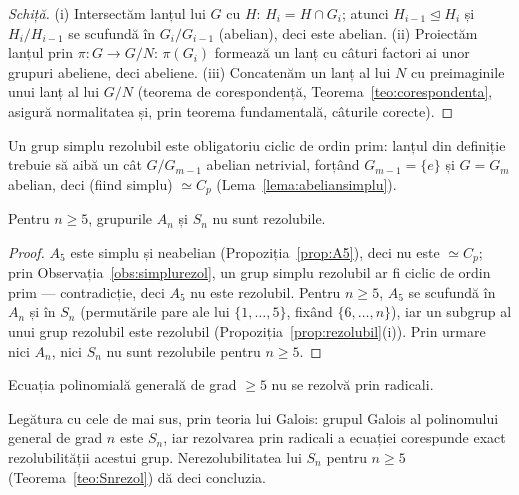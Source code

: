 \begin{proof}[Schiță]
(i) Intersectăm lanțul lui $G$ cu $H$: $H_i=H\cap G_i$; atunci $H_{i-1}\trianglelefteq H_i$ și $H_i/H_{i-1}$ se scufundă în $G_i/G_{i-1}$ (abelian), deci este abelian. (ii) Proiectăm lanțul prin $\pi:G\to G/N$: $\pi(G_i)$ formează un lanț cu câturi factori ai unor grupuri abeliene, deci abeliene. (iii) Concatenăm un lanț al lui $N$ cu preimaginile unui lanț al lui $G/N$ (teorema de corespondență, Teorema~\ref{teo:corespondenta}, asigură normalitatea și, prin teorema fundamentală, câturile corecte).
\end{proof}

\begin{observatie}
\label{obs:simplurezol}Un grup simplu rezolubil este obligatoriu ciclic de ordin prim: lanțul din definiție trebuie să aibă un cât $G/G_{m-1}$ abelian netrivial, forțând $G_{m-1}=\{e\}$ și $G=G_m$ abelian, deci (fiind simplu) $\simeq C_p$ (Lema~\ref{lema:abeliansimplu}).
\end{observatie}

\begin{teorema}\label{teo:Snrezol}
Pentru $n\ge5$, grupurile $A_n$ și $S_n$ nu sunt rezolubile.
\end{teorema}

\begin{proof}
$A_5$ este simplu și neabelian (Propoziția~\ref{prop:A5}), deci nu este $\simeq C_p$; prin Observația~\ref{obs:simplurezol}, un grup simplu rezolubil ar fi ciclic de ordin prim --- contradicție, deci $A_5$ nu este rezolubil. Pentru $n\ge5$, $A_5$ se scufundă în $A_n$ și în $S_n$ (permutările pare ale lui $\{1,\dots,5\}$, fixând $\{6,\dots,n\}$), iar un subgrup al unui grup rezolubil este rezolubil (Propoziția~\ref{prop:rezolubil}(i)). Prin urmare nici $A_n$, nici $S_n$ nu sunt rezolubile pentru $n\ge5$.
\end{proof}

\begin{teorema}\label{teo:abelruffini}
Ecuația polinomială generală de grad $\ge5$ nu se rezolvă prin radicali.
\end{teorema}

Legătura cu cele de mai sus, prin teoria lui Galois: grupul Galois al polinomului general de grad $n$ este $S_n$, iar rezolvarea prin radicali a ecuației corespunde exact rezolubilității acestui grup. Nerezolubilitatea lui $S_n$ pentru $n\ge5$ (Teorema~\ref{teo:Snrezol}) dă deci concluzia.

